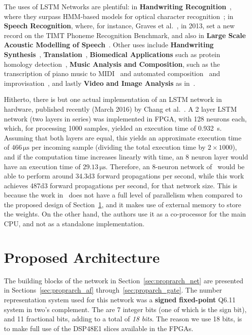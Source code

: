\documentclass{IEEEtran}
\begin{document}
The uses of LSTM Networks are plentiful: in \textbf{Handwriting Recognition}~\cite{ICDAR09}, where they surpass
HMM-based models for optical character recognition~\cite{Breuel13}; in \textbf{Speech Recognition}, where, for
instance, Graves et al.~\cite{Graves13}, in 2013, set a new record on the TIMT Phoneme Recognition Benchmark,
and also in \textbf{Large Scale Acoustic Modelling of Speech}~\cite{Sak14}. Other uses include
\textbf{Handwriting Synthesis}~\cite{Graves13_2}, \textbf{Translation}~\cite{Sustkever14}, \textbf{Biomedical Applications} such
as protein homology detection~\cite{Hochreiter07}, \textbf{Music Analysis and Composition}, such as the transcription of piano music
to MIDI~\cite{Bock12} and automated composition~\cite{Coca13} and improvisation~\cite{Eck02}, and lastly \textbf{Video and Image Analysis} as
in~\cite{Vinyals14, Donahue14, Donahue14_2}.

Hitherto, there is but one actual implementation of an LSTM network in hardware, published recently
(March 2016) by Chang et al.~\cite{Chang15}. A 2 layer LSTM network (two layers in series) was implemented in FPGA,
with 128 neurons each, which, for processing 1000 samples, yielded an execution time of \SI{0.932}{\second}. Assuming
that both layers are equal, this yields an approximate execution time of $466 \, \si{\micro\second}$ per incoming sample (dividing the total execution time by $2 \times 1000$), and
if the computation time increases linearly with time, an 8 neuron layer would have an execution time of $29.13 \, \si{\micro\second}$.
Therefore, an 8-neuron network of~\cite{Chang15} would be able to perform around \num{34.3d3} forward propagations per second, while this work achieves \num{487d3} forward propagations per second, for that network size. This is because the work in~\cite{Chang15} does not have a full level of parallelism when compared to the proposed design of
Section~\ref{sec:proparch}, and it makes use of external memory to store the weights. On the other hand, the authors use it as a co-processor for the main CPU, and not as a
standalone implementation.

\section{Proposed Architecture}\label{sec:proparch}

The building blocks of the network in Section~\ref{sec:proprarch_net} are presented in Sections~\ref{sec:proprarch_af} through~\ref{sec:proparch_gate}.
The number representation system used for this network was a \textbf{signed fixed-point} Q6.11 system in two's complement. The are 7 integer bits (one of which is
the sign bit), and 11 fractional bits, adding to a total of \textit{18 bits}. The reason we use 18 bits, is to make full use of the DSP48E1 slices available
in the FPGAs.
\end{document}
